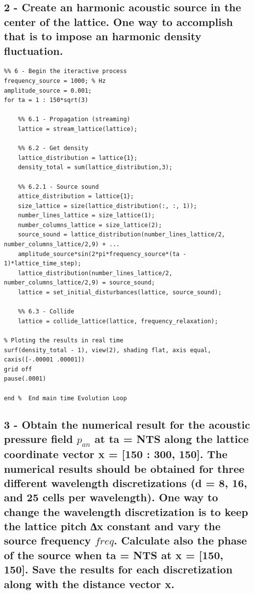 \subsection{2 - Create an harmonic acoustic source in the center of the lattice. One way to accomplish that is to impose
an harmonic density fluctuation.}
\begin{lstlisting}
%% 6 - Begin the iteractive process
frequency_source = 1000; % Hz
amplitude_source = 0.001;
for ta = 1 : 150*sqrt(3)
    
    %% 6.1 - Propagation (streaming)
    lattice = stream_lattice(lattice);

    %% 6.2 - Get density
    lattice_distribution = lattice{1};
    density_total = sum(lattice_distribution,3);

    %% 6.2.1 - Source sound
    attice_distribution = lattice{1};
	size_lattice = size(lattice_distribution(:, :, 1));
	number_lines_lattice = size_lattice(1);
	number_columns_lattice = size_lattice(2);
    source_sound = lattice_distribution(number_lines_lattice/2, number_columns_lattice/2,9) + ...
    amplitude_source*sin(2*pi*frequency_source*(ta - 1)*lattice_time_step);
	lattice_distribution(number_lines_lattice/2, number_columns_lattice/2,9) = source_sound;
 	lattice = set_initial_disturbances(lattice, source_sound);   

    %% 6.3 - Collide
    lattice = collide_lattice(lattice, frequency_relaxation);
    
% Ploting the results in real time   
surf(density_total - 1), view(2), shading flat, axis equal, caxis([-.00001 .00001])
grid off
pause(.0001) 

end %  End main time Evolution Loop
\end{lstlisting}

\subsection{3 - Obtain the numerical result for the acoustic pressure field $p_{an}$ at ta = NTS along the lattice coordinate
vector x = [150 : 300, 150]. The numerical results should be obtained for three different wavelength
discretizations (d = 8, 16, and 25 cells per wavelength). One way to change the wavelength discretization
is to keep the lattice pitch ∆x constant and vary the source frequency $freq$. Calculate also the phase of
the source when ta = NTS at x = [150, 150]. Save the results for each discretization along with the
distance vector x.}

